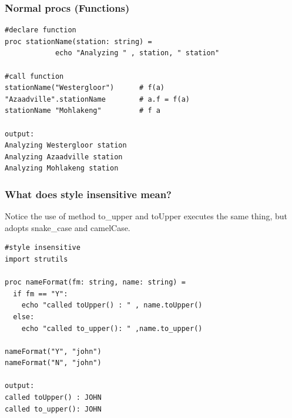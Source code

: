 \documentclass[10pt, a4paper, twocolumn]{article} %
\begin{document}
\subsubsection{Normal procs (Functions)}

\begin{lstlisting}
#declare function
proc stationName(station: string) =
			echo "Analyzing " , station, " station"

#call function
stationName("Westergloor")      # f(a)
"Azaadville".stationName        # a.f = f(a)
stationName "Mohlakeng"         # f a

output:
Analyzing Westergloor station
Analyzing Azaadville station
Analyzing Mohlakeng station
\end{lstlisting}

\subsubsection{What does style insensitive mean?}

Notice the use of method to\_upper\(\) and toUpper\(\) executes
the same thing, but adopts snake\_case and camelCase.

\begin{lstlisting}
#style insensitive
import strutils

proc nameFormat(fm: string, name: string) =
  if fm == "Y":
    echo "called toUpper() : " , name.toUpper()
  else:
    echo "called to_upper(): " ,name.to_upper()

nameFormat("Y", "john")
nameFormat("N", "john")

output:
called toUpper() : JOHN
called to_upper(): JOHN
\end{lstlisting}

\printbibliography[title={Bibliography}] %

\end{document}
